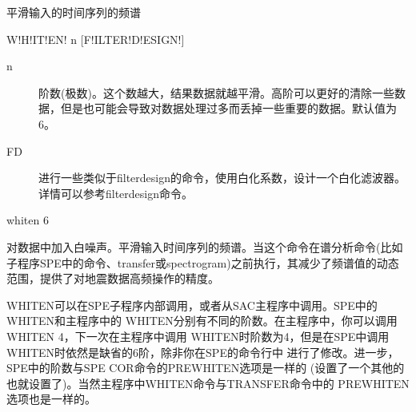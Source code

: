 \label{cmd:whiten}

平滑输入的时间序列的频谱

\begin{SACSTX}
W!H!IT!EN! n [F!ILTER!D!ESIGN!]
\end{SACSTX}

\begin{description}
\item [n]  阶数(极数)。这个数越大，结果数据就越平滑。高阶可以更好的清除一些数据，但是也可能会导致对数据处理过多而丢掉一些重要的数据。默认值为6。
\item [FD] 进行一些类似于filterdesign的命令，使用白化系数，设计一个白化滤波器。详情可以参考filterdesign命令。
\end{description}

\begin{SACDFT}
whiten 6
\end{SACDFT}

对数据中加入白噪声。平滑输入时间序列的频谱。当这个命令在谱分析命令(比如子程序SPE中的命令、transfer或spectrogram)之前执行，其减少了频谱值的动态范围，提供了对地震数据高频操作的精度。

WHITEN可以在SPE子程序内部调用，或者从SAC主程序中调用。SPE中的WHITEN和主程序中的
WHITEN分别有不同的阶数。在主程序中，你可以调用WHITEN 4，下一次在主程序中调用
WHITEN时阶数为4，但是在SPE中调用WHITEN时依然是缺省的6阶，除非你在SPE的命令行中
进行了修改。进一步，SPE中的阶数与SPE COR命令的PREWHITEN选项是一样的
(设置了一个其他的也就设置了)。当然主程序中WHITEN命令与TRANSFER命令中的
PREWHITEN选项也是一样的。

